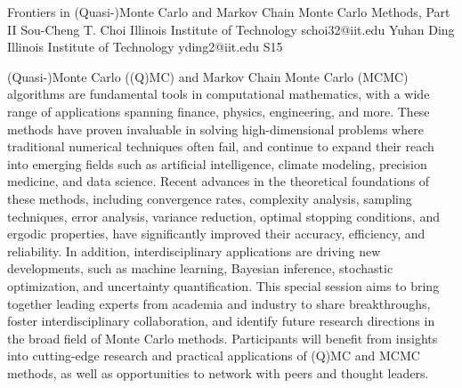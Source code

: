\begin{session}
 {Frontiers in (Quasi-)Monte Carlo and Markov Chain Monte Carlo Methods, Part II}%
 {Sou-Cheng T.  Choi}%
 {Illinois Institute of Technology}%
 {schoi32@iit.edu}%
 {Yuhan Ding}%
 {Illinois Institute of Technology}%
 {yding2@iit.edu}%
 {S15}%
{}

 (Quasi-)Monte Carlo ((Q)MC) and Markov Chain Monte Carlo (MCMC) algorithms are fundamental tools in computational mathematics, with a wide range of applications spanning finance, physics, engineering, and more. These methods have proven invaluable in solving high-dimensional problems where traditional numerical techniques often fail, and continue to expand their reach into emerging fields such as artificial intelligence, climate modeling, precision medicine, and data science.
 Recent advances in the theoretical foundations of these methods, including convergence rates, complexity analysis, sampling techniques, error analysis, variance reduction, optimal stopping conditions, and ergodic properties, have significantly improved their accuracy, efficiency, and reliability. In addition, interdisciplinary applications are driving new developments, such as machine learning, Bayesian inference, stochastic optimization, and uncertainty quantification.
 This special session aims to bring together leading experts from academia and industry to share breakthroughs, foster interdisciplinary collaboration, and identify future research directions in the broad field of Monte Carlo methods. Participants will benefit from insights into cutting-edge research and practical applications of (Q)MC and MCMC methods, as well as opportunities to network with peers and thought leaders.
\end{session}



\clearpage

